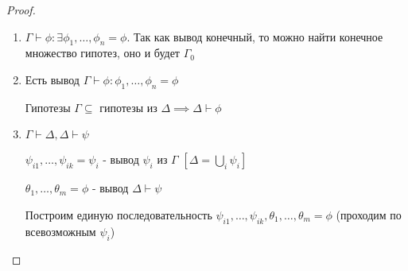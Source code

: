 \documentclass[a4paper]{article}
\theoremstyle{definition}
\theoremstyle{remark}
\begin{document}
    \begin{proof}
        $ $\\
        \begin{enumerate}
            \item $\Gamma\vdash \phi: \exists\phi_1, \dots, \phi_n = \phi$.
            Так как вывод конечный, то можно найти конечное множество гипотез, оно и будет $\Gamma_0$
            \item Есть вывод $\Gamma\vdash \phi: \phi_1, \dots, \phi_n = \phi$
            
            Гипотезы $\Gamma\subseteq$ гипотезы из $\Delta\implies\Delta \vdash \phi$
            \item $\Gamma \vdash \Delta, \Delta\vdash\psi$
            
            $\psi_{i1},\dots, \psi_{ik} = \psi_i$ - вывод $\psi_i$ из $\Gamma$ $[\Delta = \bigcup_{i}\psi_i]$

            $\theta_1, \dots, \theta_m = \phi$ - вывод $\Delta\vdash\psi$

            Построим единую последовательность $\psi_{i1},\dots, \psi_{ik}, \theta_1, \dots, \theta_m = \phi$ (проходим по всевозможным
            $\psi_i$)
        \end{enumerate}
    \end{proof}
\end{document}
